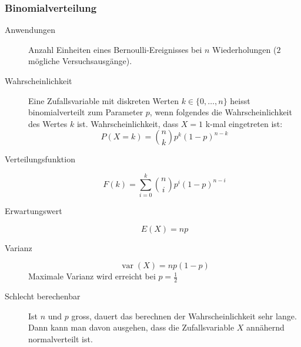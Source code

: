 \subsubsection{Binomialverteilung}
\begin{description}
  \item[Anwendungen] Anzahl Einheiten eines Bernoulli-Ereignisses bei
    $n$ Wiederholungen ($2$ mögliche Versuchsausgänge).
  \item[Wahrscheinlichkeit] Eine Zufallsvariable mit diskreten Werten
    $k \in \{0, \dots, n\}$ heisst binomialverteilt zum Parameter $p$,
    wenn folgendes die Wahrscheinlichkeit des Wertes $k$ ist.
    Wahrscheinlichkeit, dass $X = 1$ k-mal eingetreten ist:
    \[P(X = k) = \binom{n}{k} p^k(1-p)^{n-k}\]
  \item[Verteilungsfunktion] \[F(k) = \sum_{i=0}^k \binom{n}{i} p^i(1-p)^{n-i}\]
  \item[Erwartungswert] \[E(X) = np\]
  \item[Varianz] \[\operatorname{var}(X) = np(1-p)\]
    Maximale Varianz wird erreicht bei $p = \frac{1}{2}$
  \item[Schlecht berechenbar] Ist $n$ und $p$ gross, dauert das
  berechnen der Wahrscheinlichkeit sehr lange. Dann kann man davon
  ausgehen, dass die Zufallsvariable $X$ annähernd normalverteilt ist.
\end{description}



